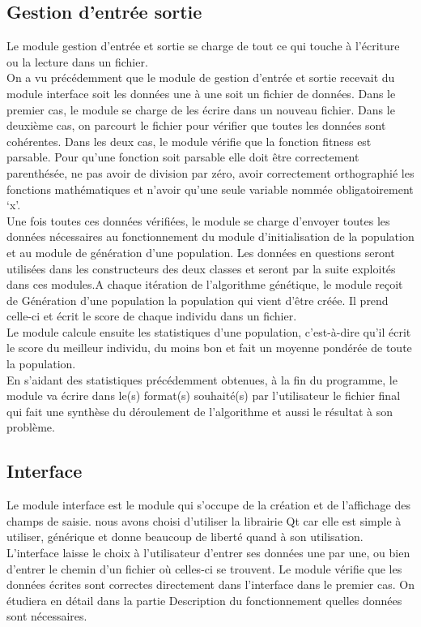 \documentclass[a4paper,11pt]{article}
\begin{document}
		\subsection{Gestion d'entrée sortie}
			Le module gestion d’entrée et sortie se charge de tout ce qui touche à l’écriture ou la lecture dans un fichier.\\
			On a vu précédemment que le module de gestion d’entrée et sortie recevait du module interface soit les données une à une soit un fichier de données.
			Dans le premier cas, le module se charge de les écrire dans un nouveau fichier.
			Dans le deuxième cas, on parcourt le fichier pour vérifier que toutes les données sont cohérentes. Dans les deux cas, le module vérifie que la fonction fitness est parsable.
			Pour qu’une fonction soit parsable elle doit être correctement parenthésée, ne pas avoir de division par zéro, avoir correctement orthographié les fonctions mathématiques et n’avoir qu’une seule variable nommée obligatoirement ‘x’.\\
			Une fois toutes ces données vérifiées, le module se charge d’envoyer toutes les données nécessaires au fonctionnement du module d’initialisation de la population et au module de génération d’une population. 
			Les données en questions seront utilisées dans les constructeurs des deux classes et seront par la suite exploités dans ces modules.A chaque itération de l’algorithme génétique, le module reçoit de Génération d’une population la population qui vient d’être créée.
			Il prend celle-ci et écrit le score de chaque individu dans un fichier.\\
			Le module calcule ensuite les statistiques d’une population, c’est-à-dire qu’il écrit le score du meilleur individu, du moins bon et fait un moyenne pondérée de toute la population.\\
			En s’aidant des statistiques précédemment obtenues, à la fin du programme, le module va écrire dans le(s) format(s) souhaité(s) par l’utilisateur le fichier final qui fait une synthèse du déroulement de l’algorithme et aussi le résultat à son problème.
		
		\subsection{Interface}
			Le module interface est le module qui s’occupe de la création et de l’affichage des champs de saisie. nous avons choisi d'utiliser la librairie Qt car elle est simple à utiliser, générique et donne beaucoup de liberté quand à son utilisation.\\	
			L’interface laisse le choix à l’utilisateur d’entrer ses données une par une, ou bien d’entrer le chemin  d’un fichier où celles-ci se trouvent.
			Le module vérifie que les données écrites sont correctes directement dans l’interface dans le premier cas.
			On étudiera en détail dans la partie Description du fonctionnement quelles données sont nécessaires.\\
\end{document}
